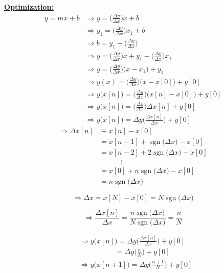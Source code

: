 \documentclass{article}
\DeclareMathOperator{\sgn}{sgn}
\begin{document}
\underline{\textbf{Optimization:}}
\begin{align*}
    y = mx + b &\Rightarrow y = \bigg(\frac{\Delta y}{\Delta x}\bigg)x + b \\
               &\Rightarrow y_{1} = \bigg(\frac{\Delta y}{\Delta x}\bigg)x_{1} + b \\
               &\Rightarrow b = y_{1} - \bigg(\frac{\Delta y}{\Delta x}\bigg) \\
               &\Rightarrow y = \bigg(\frac{\Delta y}{\Delta x}\bigg)x + y_{1} - \bigg(\frac{\Delta y}{\Delta x}\bigg)x_{1} \\
               &\Rightarrow y = \bigg(\frac{\Delta y}{\Delta x}\bigg)\big(x - x_{1}\big) + y_{1} \\
               &\Rightarrow y(x) = \bigg(\frac{\Delta y}{\Delta x}\bigg)\Big(x - x[0]\Big) + y[0] \\
               &\Rightarrow y\Big(x[n]\Big) = \bigg(\frac{\Delta y}{\Delta x}\bigg)\Big(x[n] - x[0]\Big) + y[0] \\
               &\Rightarrow y\Big(x[n]\Big) = \bigg(\frac{\Delta y}{\Delta x}\bigg)\Delta x[n] + y[0] \\
               &\Rightarrow y\Big(x[n]\Big) = \Delta y\bigg(\frac{\Delta x[n]}{\Delta x}\bigg) + y[0]
\end{align*}
\begin{align*}
    \Rightarrow \Delta x[n] &\equiv x[n] - x[0] \\
                            &= x[n - 1] + \sgn\big(\Delta x\big) - x[0] \\
                            &= x[n - 2] + 2\sgn\big(\Delta x\big) - x[0] \\
                            & \quad \quad \quad \vdots \\
                            &= x[0] + n\sgn\big(\Delta x\big) - x[0] \\
                            &= n\sgn\big(\Delta x\big)
\end{align*}

\begin{equation*}
    \Rightarrow \Delta x = x[N] - x[0] = N\sgn\big(\Delta x\big)
\end{equation*}

\begin{equation*}
    \Rightarrow \frac{\Delta x[n]}{\Delta x} = \frac{n\sgn\big(\Delta x\big)}{N\sgn\big(\Delta x\big)} = \frac{n}{N}
\end{equation*}

\begin{align*}
    &\Rightarrow y\Big(x[n]\Big) = \Delta y\bigg(\frac{\Delta x[n]}{\Delta x}\bigg) + y[0] \\
    & \quad \quad \quad \quad \quad = \Delta y\bigg(\frac{n}{N}\bigg) + y[0] \\
    &\Rightarrow y\Big(x[n + 1]\Big) = \Delta y\bigg(\frac{n + 1}{N}\bigg) + y[0]
\end{align*}
\end{document}

